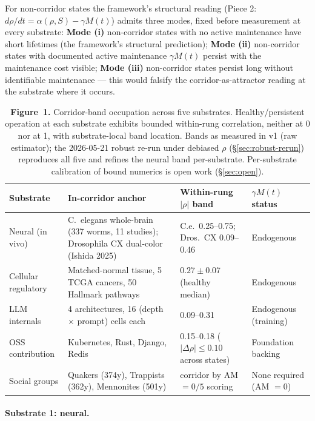 \documentclass[11pt,a4paper]{article}
\begin{document}
For non-corridor states the framework's structural reading (Piece 2: $d\rho/dt = \alpha(\rho, S) - \gamma M(t)$) admits three modes, fixed before measurement at every substrate: \textbf{Mode (i)} non-corridor states with no active maintenance have short lifetimes (the framework's structural prediction); \textbf{Mode (ii)} non-corridor states with documented active maintenance $\gamma M(t)$ persist with the maintenance cost visible; \textbf{Mode (iii)} non-corridor states persist long without identifiable maintenance --- this would falsify the corridor-as-attractor reading at the substrate where it occurs.

\begin{table}[h]
\centering
\small
\renewcommand{\arraystretch}{1.2}
\begin{tabular}{@{}p{2.5cm}p{4cm}p{3.5cm}p{3cm}@{}}
\toprule
\textbf{Substrate} & \textbf{In-corridor anchor} & \textbf{Within-rung $|\rho|$ band} & \textbf{$\gamma M(t)$ status} \\
\midrule
Neural (in vivo) & C.~elegans whole-brain (337 worms, 11 studies); Drosophila CX dual-color (Ishida 2025) & C.e.\ 0.25--0.75; Dros.\ CX 0.09--0.46 & Endogenous \\
Cellular regulatory & Matched-normal tissue, 5 TCGA cancers, 50 Hallmark pathways & $0.27 \pm 0.07$ (healthy median) & Endogenous \\
LLM internals & 4 architectures, 16 (depth $\times$ prompt) cells each & 0.09--0.31 & Endogenous (training) \\
OSS contribution & Kubernetes, Rust, Django, Redis & 0.15--0.18 ($|\Delta\rho| \le 0.10$ across states) & Foundation backing \\
Social groups & Quakers (374y), Trappists (362y), Mennonites (501y) & corridor by AM $= 0/5$ scoring & None required (AM $= 0$) \\
\bottomrule
\end{tabular}
\caption{\textbf{Figure~1.} Corridor-band occupation across five substrates. Healthy/persistent operation at each substrate exhibits bounded within-rung correlation, neither at 0 nor at 1, with substrate-local band location. Bands as measured in v1 (raw estimator); the 2026-05-21 robust re-run under debiased $\rho$ (\S\ref{sec:robust-rerun}) reproduces all five and refines the neural band per-substrate. Per-substrate calibration of bound numerics is open work (\S\ref{sec:open}).}
\label{fig:corridor-occupation}
\end{table}

\paragraph{Substrate 1: neural.}
\end{document}
